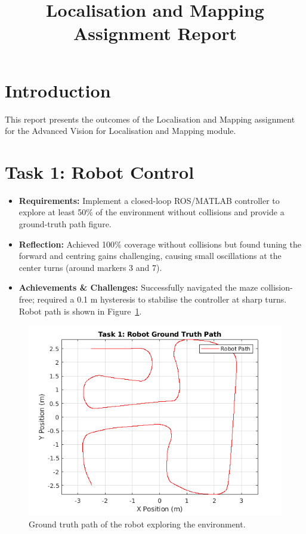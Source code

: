 \documentclass[conference]{IEEEtran}
\begin{document}
\title{Localisation and Mapping Assignment Report}

\author{
}

\maketitle

\section{Introduction}
This report presents the outcomes of the Localisation and Mapping assignment for the Advanced Vision for Localisation and Mapping module.

\section{Task 1: Robot Control} 
\begin{itemize}
  \item \textbf{Requirements:} Implement a closed-loop ROS/MATLAB controller to explore at least 50\% of the environment without collisions and provide a ground-truth path figure.
  \item \textbf{Reflection:} Achieved 100\% coverage without collisions but found tuning the forward and centring gains challenging, causing small oscillations at the center turns (around markers 3 and 7).
  \item \textbf{Achievements \& Challenges:} Successfully navigated the maze collision-free; required a 0.1 m hysteresis to stabilise the controller at sharp turns. Robot path is shown in Figure~\ref{fig:task1_route}.
\end{itemize}
\begin{figure}[ht]
  \centering
  \includegraphics[width=\linewidth]{images/Task1_Route.png}
  \caption{Ground truth path of the robot exploring the environment.}
  \label{fig:task1_route}
\end{figure}
\end{document}

